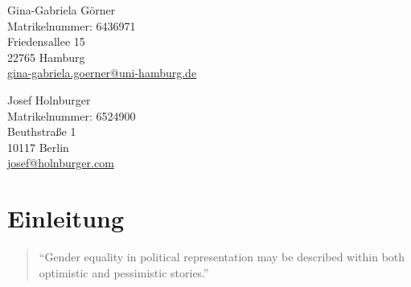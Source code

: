 \documentclass[12pt, 
    twoside=false, 
    bibliography=totoc, 
    numbers=endperiod, 
    headings=normal, 
    toc=chapterentrydotfill
    ]{scrbook}
\begin{document}
\begin{titlepage}
	\begin{minipage}[t]{0.48\textwidth}
    \flushleft 
    Gina-Gabriela Görner \\
    Matrikelnummer: 6436971 \\
    Friedensallee 15 \vspace{0.1cm} \\ 
	22765 Hamburg \vspace{0.1cm}  \\
	\href{mailto:gina-gabriela.goerner@uni-hamburg.de}{gina-gabriela.goerner@uni-hamburg.de} \\
    \end{minipage}
    \begin{minipage}[t]{0.48\textwidth}
	\flushleft
	Josef Holnburger \\
	Matrikelnummer: 6524900 \\
	Beuthstraße 1 \vspace{0.1cm} \\
	10117 Berlin \vspace{0.1cm} \\
	\href{mailto:josef@holnburger.com}{josef@holnburger.com} \\
    \end{minipage}

\end{titlepage}


\tableofcontents
\thispagestyle{empty}

\frontmatter

\listoffigures
{}
\vspace*{24pt}
{\let\clearpage\relax \listoftables}	

\mainmatter



\chapter{Einleitung}\label{Einleitung} 

\begin{quote}
    \enquote{Gender equality in political representation may be described within both optimistic and pessimistic stories.} \parencite[149]{celis_2018}
\end{quote}
\end{document}
